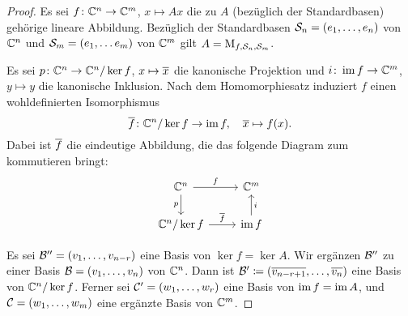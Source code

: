\begin{proof}
  Es sei $f \colon \mathbb{C}^n \to \mathbb{C}^m$, $x \mapsto Ax$ die zu $A$ (bezüglich der Standardbasen) gehörige lineare Abbildung.
  Bezüglich der Standardbasen $\mathcal{S}_n = (e_1, \dotsc, e_n)$ von $\mathbb{C}^n$ und $\mathcal{S}_m = (e_1, \dotsc e_m)$ von $\mathbb{C}^m$ gilt $A = \operatorname{M}_{f, \mathcal{S}_n, \mathcal{S}_m}$.
  
  Es sei $p \colon \mathbb{C}^n \to \mathbb{C}^n / \ker f$, $x \mapsto \overline{x}$ die kanonische Projektion und $i \colon \operatorname{im} f \to \mathbb{C}^m$, $y \mapsto y$ die kanonische Inklusion.
  Nach dem Homomorphiesatz induziert $f$ einen wohldefinierten Isomorphismus
  \[
            \overline{f}
    \colon  \mathbb{C}^n / \ker f
    \to     \operatorname{im} f,
    \quad   \overline{x}
    \mapsto f(x).
  \]
  Dabei ist $\overline{f}$ die eindeutige Abbildung, die das folgende Diagram zum kommutieren bringt:
  \[
    \begin{tikzcd}
        \complex^n
        \arrow{r}{f}
        \arrow[swap]{d}{p}
      & \complex^m
      \\
        \complex^n / \ker f
        \arrow{r}{\induced{f}}
      & \im f
        \arrow[swap]{u}{i}
    \end{tikzcd}
  \]
  
  Es sei $\mathcal{B}'' = (v_1, \dotsc, v_{n-r})$ eine Basis von $\ker f = \ker A$.
  Wir ergänzen $\mathcal{B}''$ zu einer Basis $\mathcal{B} = (v_1, \dotsc, v_n)$ von $\mathbb{C}^n$.
  Dann ist $\mathcal{B}' \coloneqq (\overline{v_{n-r+1}}, \dotsc, \overline{v_n})$ eine Basis von $\mathbb{C}^n / \ker f$.
  Ferner sei $\mathcal{C}' = (w_1, \dotsc, w_r)$ eine Basis von $\operatorname{im} f = \operatorname{im} A$, und $\mathcal{C} = (w_1, \dotsc, w_m)$ eine ergänzte Basis von $\mathbb{C}^m$.
  

\end{proof}
